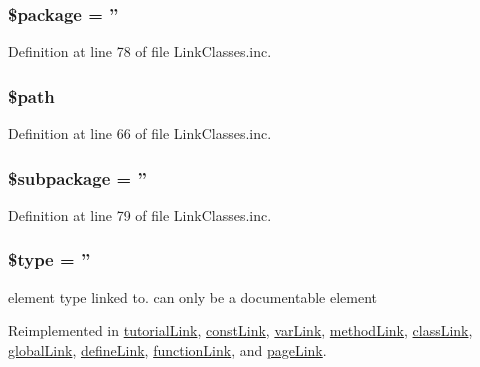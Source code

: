 \hypertarget{classabstract_link_a365395516cc195292e97e09bc0d165ae}{
\subsubsection[{\$package}]{\setlength{\rightskip}{0pt plus 5cm}\$package = ''}}\label{classabstract_link_a365395516cc195292e97e09bc0d165ae}


\-Definition at line 78 of file \-Link\-Classes.\-inc.

\hypertarget{classabstract_link_a0a4baf0b22973c07685c3981f0d17fc4}{
\subsubsection[{\$path}]{\setlength{\rightskip}{0pt plus 5cm}\$path}}\label{classabstract_link_a0a4baf0b22973c07685c3981f0d17fc4}


\-Definition at line 66 of file \-Link\-Classes.\-inc.

\hypertarget{classabstract_link_ac601dc8dc2a086b6381128cc9c7a3fc5}{
\subsubsection[{\$subpackage}]{\setlength{\rightskip}{0pt plus 5cm}\$subpackage = ''}}\label{classabstract_link_ac601dc8dc2a086b6381128cc9c7a3fc5}


\-Definition at line 79 of file \-Link\-Classes.\-inc.

\hypertarget{classabstract_link_a9a4a6fba2208984cabb3afacadf33919}{
\subsubsection[{\$type}]{\setlength{\rightskip}{0pt plus 5cm}\$type = ''}}\label{classabstract_link_a9a4a6fba2208984cabb3afacadf33919}
element type linked to. can only be a documentable element 

\-Reimplemented in \hyperlink{classtutorial_link_a9a4a6fba2208984cabb3afacadf33919}{tutorial\-Link}, \hyperlink{classconst_link_a9a4a6fba2208984cabb3afacadf33919}{const\-Link}, \hyperlink{classvar_link_a9a4a6fba2208984cabb3afacadf33919}{var\-Link}, \hyperlink{classmethod_link_a9a4a6fba2208984cabb3afacadf33919}{method\-Link}, \hyperlink{classclass_link_a9a4a6fba2208984cabb3afacadf33919}{class\-Link}, \hyperlink{classglobal_link_a9a4a6fba2208984cabb3afacadf33919}{global\-Link}, \hyperlink{classdefine_link_a9a4a6fba2208984cabb3afacadf33919}{define\-Link}, \hyperlink{classfunction_link_a9a4a6fba2208984cabb3afacadf33919}{function\-Link}, and \hyperlink{classpage_link_a9a4a6fba2208984cabb3afacadf33919}{page\-Link}.



